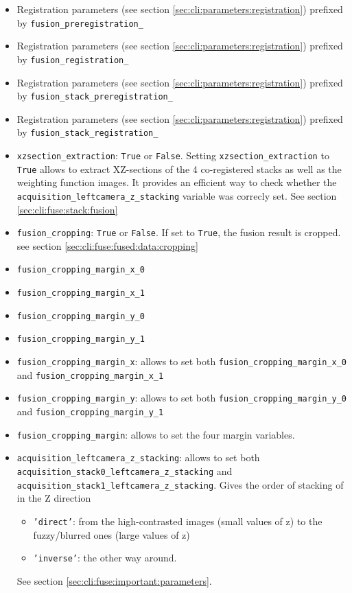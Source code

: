 \begin{itemize}
\item Registration parameters 
  (see section \ref{sec:cli:parameters:registration}) prefixed 
  by \texttt{fusion\_preregistration\_}
\item Registration parameters 
  (see section \ref{sec:cli:parameters:registration}) prefixed 
  by \texttt{fusion\_registration\_}
\item Registration parameters 
  (see section \ref{sec:cli:parameters:registration}) prefixed 
  by \texttt{fusion\_stack\_preregistration\_}
\item Registration parameters 
  (see section \ref{sec:cli:parameters:registration}) prefixed 
  by \texttt{fusion\_stack\_registration\_}
  
\item \texttt{xzsection\_extraction}:
  \texttt{True} or \texttt{False}.
  Setting \texttt{xzsection\_extraction} to \texttt{True} allows 
  to extract XZ-sections of the 4 co-registered stacks as well as 
  the weighting function images. It provides an efficient way to check
  whether the \texttt{acquisition\_leftcamera\_z\_stacking} variable 
  was correcly set.
  See section \ref{sec:cli:fuse:stack:fusion}
  
\item \texttt{fusion\_cropping}:
  \texttt{True} or \texttt{False}. If set to \texttt{True}, 
  the fusion result is cropped.
  see section \ref{sec:cli:fuse:fused:data:cropping}
\item \texttt{fusion\_cropping\_margin\_x\_0}
\item \texttt{fusion\_cropping\_margin\_x\_1}
\item \texttt{fusion\_cropping\_margin\_y\_0}
\item \texttt{fusion\_cropping\_margin\_y\_1}
\item \texttt{fusion\_cropping\_margin\_x}:
  allows to set both \texttt{fusion\_cropping\_margin\_x\_0}
  and \texttt{fusion\_cropping\_margin\_x\_1}
\item \texttt{fusion\_cropping\_margin\_y}:
  allows to set both \texttt{fusion\_cropping\_margin\_y\_0}
  and \texttt{fusion\_cropping\_margin\_y\_1}
\item \texttt{fusion\_cropping\_margin}:
  allows to set the four margin variables.
  
\item \texttt{acquisition\_leftcamera\_z\_stacking}:
  allows to set both \texttt{acquisition\_stack0\_leftcamera\_z\_stacking} 
  and \texttt{acquisition\_stack1\_leftcamera\_z\_stacking}.
  Gives the order of stacking of in the Z direction
  \begin{itemize}
  \itemsep -0.5ex
  \item \texttt{'direct'}: from the high-contrasted images (small values of z) to the fuzzy/blurred ones (large values of z)
  \item \texttt{'inverse'}: the other way around.
  \end{itemize}
  See section \ref{sec:cli:fuse:important:parameters}.


\end{itemize}
